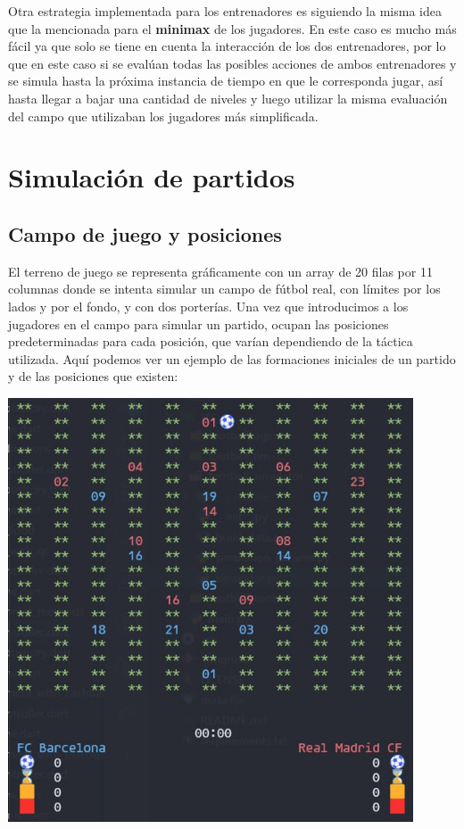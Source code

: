 \documentclass{article}
\begin{document}
Otra estrategia implementada para los entrenadores es siguiendo la misma idea que la mencionada para el \textbf{minimax} de los jugadores.
En este caso es mucho más fácil ya que solo se tiene en cuenta la interacción de los dos entrenadores, por lo que en este
caso si se evalúan todas las posibles acciones de ambos entrenadores y se simula hasta la próxima instancia de tiempo en que le corresponda
jugar, así hasta llegar a bajar una cantidad de niveles y luego utilizar la misma evaluación del campo que utilizaban los jugadores
más simplificada.   

\section{Simulación de partidos}
\subsection{Campo de juego y posiciones}
El terreno de juego se representa gráficamente con un
array de 20 filas por 11 columnas donde se intenta simular un campo de fútbol real, con límites por los lados y por 
el fondo, y con dos porterías. Una vez que introducimos a los jugadores en el campo para simular un partido, ocupan 
las posiciones predeterminadas para cada posición, que varían dependiendo de la táctica utilizada. Aquí podemos ver 
un ejemplo de las formaciones iniciales de un partido y de las posiciones que existen: 

\includegraphics*[width=0.9\textwidth]{filed.jpg}
\bigskip
\end{document}
